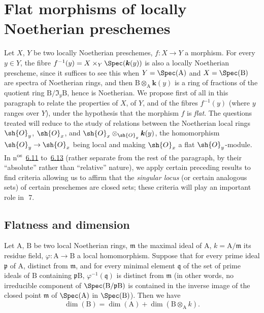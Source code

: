 \section{Flat morphisms of locally Noetherian preschemes}
\label{section:IV.6}

Let $X$, $Y$ be two locally Noetherian preschemes, $f:X\to Y$ a morphism.
For every $y\in Y$, the fibre $f^{-1}(y)=X\times_Y\Spec(\boldsymbol{k}(y))$ is also a locally Noetherian prescheme, since it suffices to see this when $Y=\Spec(\mathrm{A})$ and $X=\Spec(\mathrm{B})$ are spectra of Noetherian rings, and then $\mathrm{B}\otimes_\mathrm{A}\boldsymbol{k}(y)$ is a ring of fractions of the quotient ring $\mathrm{B}/\mathfrak{I}_y\mathrm{B}$, hence is Noetherian.
We propose first of all in this paragraph to relate the properties of $X$, of $Y$, and of the fibres $f^{-1}(y)$ (where $y$ ranges over $Y$), under the hypothesis that the morphism $f$ is \emph{flat}.
The questions treated will reduce to the study of relations between the Noetherian local rings $\sh{O}_y$, $\sh{O}_x$, and $\sh{O}_x\otimes_{\sh{O}_y}\boldsymbol{k}(y)$, the homomorphism $\sh{O}_y\to\sh{O}_x$ being local and making $\sh{O}_x$ a flat $\sh{O}_y$-module.
In n\textsuperscript{os}~{\hyperlink{ega4.c04.subsec.6-11}{6.11}} to~{\hyperlink{ega4.c04.subsec.6-13}{6.13}} (rather separate from the rest of the paragraph, by their ``absolute'' rather than ``relative'' nature), we apply certain preceding results to find
criteria allowing us to affirm that the \emph{singular locus} (or certain analogous sets) of certain preschemes are closed sets; these criteria will play an important role in~\textsection\,7.

\subsection{Flatness and dimension}
\label{subsection:IV.6.1}

\begin{proposition}[6.1.1]
\label{IV.6.1.1}
Let $\mathrm{A}$, $\mathrm{B}$ be two local Noetherian rings, $\mathfrak{m}$ the maximal ideal of $\mathrm{A}$, $k=\mathrm{A}/\mathfrak{m}$ its residue field, $\varphi:\mathrm{A}\to\mathrm{B}$ a local homomorphism.
Suppose that for every prime ideal $\mathfrak{p}$ of $\mathrm{A}$, distinct from $\mathfrak{m}$, and for every minimal element $\mathfrak{q}$ of the set of prime ideals of $\mathrm{B}$ containing $\mathfrak{p}\mathrm{B}$, $\varphi^{-1}(\mathfrak{q})$ is distinct from $\mathfrak{m}$ (in other words, no irreducible component of $\Spec(\mathrm{B}/\mathfrak{p}\mathrm{B})$ is contained in the inverse image of the closed point $\mathfrak{m}$ of $\Spec(\mathrm{A})$ in $\Spec(\mathrm{B})$).
Then we have
\begin{equation}
  \dim(\mathrm{B})=\dim(\mathrm{A})+\dim(\mathrm{B}\otimes_\mathrm{A} k).
  \tag{6.1.1.1}
\label{IV.6.1.1.1}
\end{equation}
\end{proposition}

